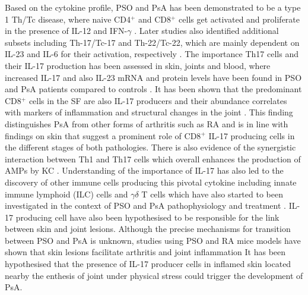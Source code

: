 Based on the cytokine profile, PSO and PsA has been demonstrated to be a type 1 Th/Tc disease, where naive CD4$^{+}$ and CD8$^{+}$ cells get activated and proliferate in the presence of IL-12 and IFN-$\gamma$ \parencite{Austin1999,Perera2012}. Later studies also identified additional subsets including Th-17/Tc-17 and Th-22/Tc-22, which are mainly dependent on IL-23 and IL-6 for their activation, respectively \parencite{Mahil2016}. The importance Th17 cells and their IL-17 production has been assessed in skin, joints and blood, where increased IL-17 and also IL-23 mRNA and protein levels have been found in PSO and PsA patients compared to controls \parencite{Cai2012, reference for joints}. It has been shown that the predominant CD8$^{+}$ cells in the SF are  also IL-17 producers and their abundance correlates with markers of inflammation and structural changes in the joint \parencite{Menon2014}. This finding distinguishes PsA from other forms of arthritis such as RA and is in line with findings on skin that suggest a prominent role of CD8$^{+}$ IL-17 producing cells in the different stages of both pathologies. There is also evidence of the synergistic interaction between Th1 and Th17 cells which overall enhances the production of AMPs by KC \parencite{Kryczek2008}. Understanding of the importance of IL-17 has also led to the discovery of other immune cells producing this pivotal cytokine including innate immune lymphoid (ILC) cells and $\gamma$$\delta$ T cells which have also started to been investigated in the context of PSO and PsA pathophysiology and treatment \parencite{Meglio2014,Leijten2015}.
IL-17 producing cell have also been hypothesised to be responsible for the link between skin and joint lesions. Although the precise mechanisms for transition between PSO and PsA is unknown, studies using PSO and RA mice models have shown that skin lesions facilitate arthritis and joint inflammation %
It has been hypothesised that the presence of IL-17 producer cells in inflamed skin located nearby the enthesis of joint under physical stress could trigger the development of PsA.

